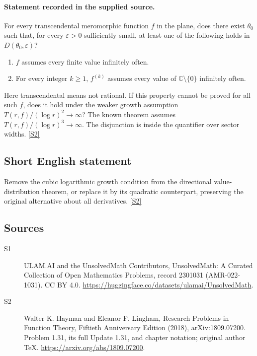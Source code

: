\documentclass[11pt]{article}
\newcommand{\sref}[2]{\hyperlink{source:#1:#2}{[S#2]}}
\begin{document}
\paragraph{Statement recorded in the supplied source.}
For every transcendental meromorphic function $f$ in the plane, does there exist $\theta_0$ such that, for every $\varepsilon>0$ sufficiently small, at least one of the following holds in $D(\theta_0,\varepsilon)$?
\begin{enumerate}
\item $f$ assumes every finite value infinitely often.
\item For every integer $k\ge1$, $f^{(k)}$ assumes every value of $\mathbb C\setminus\{0\}$ infinitely often.
\end{enumerate}
Here transcendental means not rational. If this property cannot be proved for all such $f$, does it hold under the weaker growth assumption $T(r,f)/(\log r)^2\to\infty$? The known theorem assumes $T(r,f)/(\log r)^3\to\infty$. The disjunction is inside the quantifier over sector widths. \sref{2301031}{2}
\subsection{Short English statement}
Remove the cubic logarithmic growth condition from the directional value-distribution theorem, or replace it by its quadratic counterpart, preserving the original alternative about all derivatives. \sref{2301031}{2}
\subsection{Sources}
\begin{description}
\item[\hypertarget{source:2301031:1}{S1}] ULAM.AI and the UnsolvedMath Contributors, UnsolvedMath: A Curated Collection of Open Mathematics Problems, record 2301031 (AMR-022-1031). CC BY 4.0. \url{https://huggingface.co/datasets/ulamai/UnsolvedMath}.
\item[\hypertarget{source:2301031:2}{S2}] Walter K. Hayman and Eleanor F. Lingham, Research Problems in Function Theory, Fiftieth Anniversary Edition (2018), arXiv:1809.07200. Problem 1.31, its full Update 1.31, and chapter notation; original author TeX. \url{https://arxiv.org/abs/1809.07200}.
\end{description}
\label{end:2301031}
\end{document}
